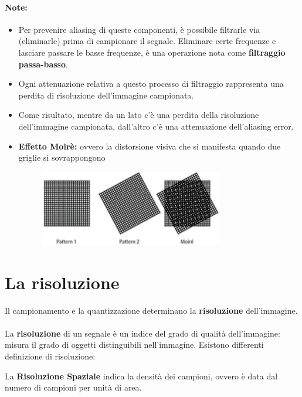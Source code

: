 \paragraph{Note:} 
\begin{itemize}
    \item Per prevenire aliasing di queste componenti, è possibile filtrarle via
          (eliminarle) prima di campionare il segnale. Eliminare certe frequenze
          e lasciare passare le basse frequenze, è una operazione nota come
          \textbf{filtraggio passa-basso}.
    \item Ogni attenuazione relativa a questo processo di filtraggio rappresenta
          una perdita di risoluzione dell'immagine campionata.
    \item Come risultato, mentre da un lato c'è una perdita della risoluzione
          dell'immagine campionata, dall'altro c'è una attenuazione
          dell'aliasing error.
    \item \textbf{Effetto Moirè:} ovvero la distorsione visiva che si manifesta
          quando due griglie si sovrappongono
          \begin{figure}[H]
              \centering
              \includegraphics[width=8cm, keepaspectratio]{capitoli/immagini/imgs/effetto_moire.jpg}
          \end{figure}
\end{itemize}

\section{La risoluzione}
Il campionamento e la quantizzazione determinano la \textbf{risoluzione}
dell'immagine. \\\\La \textbf{risoluzione} di un segnale è un indice del grado
di qualità dell'immagine: misura il grado di oggetti distinguibili
nell'immagine. Esistono differenti definizione di risoluzione:

\begin{definition}
    La \textbf{Risoluzione Spaziale} indica la densità dei campioni, ovvero è data dal numero di campioni
    per unità di area.
\end{definition}

